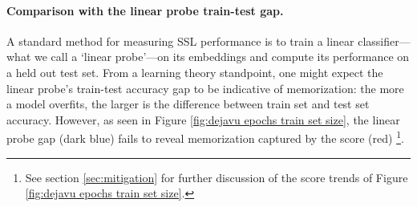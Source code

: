 \vspace{-0.75em}
\paragraph{Comparison with the linear probe train-test gap.} A standard method for measuring SSL performance is to train a linear classifier---what we call a `linear probe'---on its embeddings and compute its performance on a held out test set. From a learning theory standpoint, one might expect the linear probe's train-test accuracy gap to be indicative of memorization: the more a model overfits, the larger is the difference between train set and test set accuracy. However, as seen in Figure \ref{fig:dejavu epochs train set size}, the linear probe gap (dark blue) fails to reveal memorization captured by the \dejavu score (red) \footnote{See section \ref{sec:mitigation} for further discussion of the \dejavu score trends of Figure \ref{fig:dejavu epochs train set size}.}.

